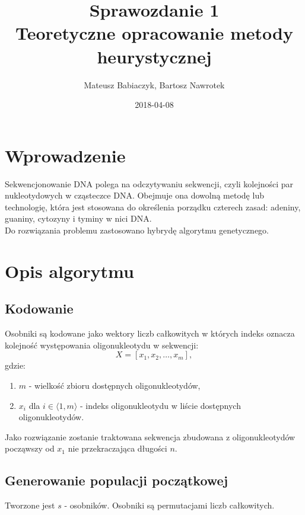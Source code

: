 \documentclass{article}
\title{Sprawozdanie 1 \\ Teoretyczne opracowanie metody heurystycznej}
\date{2018-04-08}
\author{Mateusz Babiaczyk, Bartosz Nawrotek}
\begin{document}
\maketitle
\section{Wprowadzenie}
Sekwencjonowanie DNA polega na odczytywaniu sekwencji, czyli kolejności par nukleotydowych w cząsteczce DNA. Obejmuje ona dowolną metodę lub technologię, która jest stosowana do określenia porządku czterech zasad: adeniny, guaniny, cytozyny i tyminy w nici DNA.  \\Do rozwiązania problemu zastosowano hybrydę algorytmu genetycznego.
\section{Opis algorytmu}
\subsection{Kodowanie}
Osobniki są kodowane jako wektory liczb całkowitych w których indeks oznacza kolejność występowania oligonukleotydu w sekwencji:
\begin{equation}
	X = [ x_{1}, x_{2}, \ldots , x_{m}] , 
\end{equation}
gdzie:
\begin{enumerate}
	\item $m$ - wielkość zbioru dostępnych oligonukleotydów,
	\item $x_{i}$ dla $i \in \langle1, m\rangle$ - indeks oligonukleotydu w liście dostępnych oligonukleotydów.
\end{enumerate}
Jako rozwiązanie zostanie traktowana sekwencja zbudowana z oligonukleotydów począwszy od $x_{1}$ nie przekraczająca długości $n$.
\subsection{Generowanie populacji początkowej}
Tworzone jest $s$ - osobników.
Osobniki są permutacjami liczb całkowitych.
\end{document}
